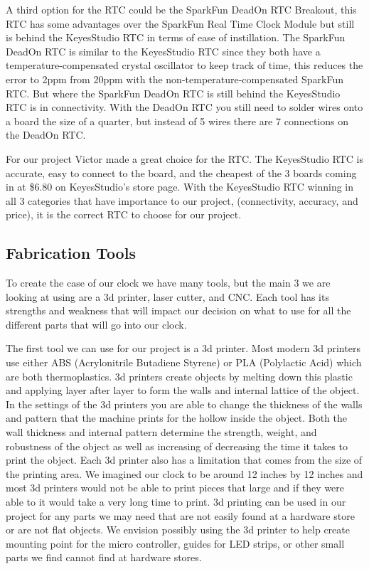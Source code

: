 \documentclass[onecolumn, draftclsnofoot,10pt, compsoc]{IEEEtran}
\begin{document}
A third option for the RTC could be the SparkFun DeadOn RTC Breakout, this RTC has some advantages over the SparkFun Real Time Clock Module but still is behind the KeyesStudio RTC in terms of ease of instillation.
The SparkFun DeadOn RTC is similar to the KeyesStudio RTC since they both have a temperature-compensated crystal oscillator to keep track of time, this reduces the error to 2ppm \cite{sfDeadOn} from 20ppm with the non-temperature-compensated SparkFun RTC.
But where the SparkFun DeadOn RTC is still behind the KeyesStudio RTC is in connectivity.
With the DeadOn RTC you still need to solder wires onto a board the size of a quarter, but instead of 5 wires there are 7 connections on the DeadOn RTC.

For our project Victor made a great choice for the RTC.
The KeyesStudio RTC is accurate, easy to connect to the board, and the cheapest of the 3 boards coming in at \$6.80 on KeyesStudio’s store page.
With the KeyesStudio RTC winning in all 3 categories that have importance to our project, (connectivity, accuracy, and price), it is the correct RTC to choose for our project.

\subsection{Fabrication Tools}
To create the case of our clock we have many tools, but the main 3 we are looking at using are a 3d printer, laser cutter, and CNC.
Each tool has its strengths and weakness that will impact our decision on what to use for all the different parts that will go into our clock.

The first tool we can use for our project is a 3d printer.
Most modern 3d printers use either ABS (Acrylonitrile Butadiene Styrene) or PLA (Polylactic Acid) which are both thermoplastics.
3d printers create objects by melting down this plastic and applying layer after layer to form the walls and internal lattice of the object.
In the settings of the 3d printers you are able to change the thickness of the walls and pattern that the machine prints for the hollow inside the object.
Both the wall thickness and internal pattern determine the strength, weight, and robustness of the object as well as increasing of decreasing the time it takes to print the object. Each 3d printer also has a limitation that comes from the size of the printing area.
We imagined our clock to be around 12 inches by 12 inches and most 3d printers would not be able to print pieces that large and if they were able to it would take a very long time to print.
3d printing can be used in our project for any parts we may need that are not easily found at a hardware store or are not flat objects.
We envision possibly using the 3d printer to help create mounting point for the micro controller, guides for LED strips, or other small parts we find cannot find at hardware stores.
\end{document}
